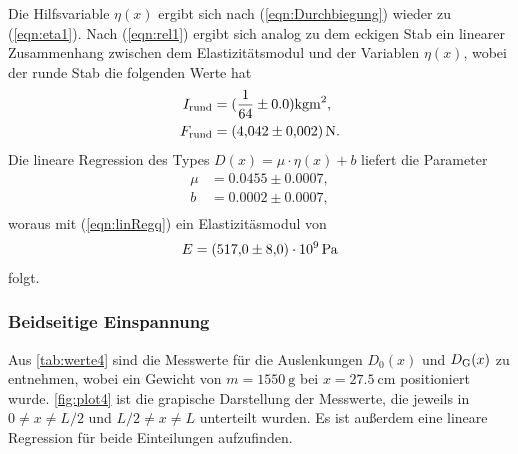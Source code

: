 \sloppy
Die Hilfsvariable $\eta(x)$ ergibt sich nach (\ref{eqn:Durchbiegung}) wieder zu (\ref{eqn:eta1}).
Nach (\ref{eqn:rel1}) ergibt sich analog zu dem eckigen Stab ein linearer Zusammenhang zwischen dem Elastizitätsmodul und
der Variablen $\eta(x)$, wobei der runde Stab die folgenden Werte hat
\begin{align*}
  I_{\text{rund}} &= (\frac{1}{64} \pm 0.0) \si{\kilo\gram\meter^2}, \\
  F_{\text{rund}} &= \SI{4.042 (0.002)}{\newton}. \\
\end{align*}
Die lineare Regression des Types $D(x) = \mu\cdot\eta(x)+b$ liefert die Parameter
\begin{align*}
  \mu &= 0.0455 \pm 0.0007,\\
  b &= 0.0002 \pm 0.0007, \\
\end{align*}
woraus mit (\ref{eqn:linRegq}) ein Elastizitäsmodul von
\begin{align*}
  E = \SI{517 (8.0)e9}{\Pa}
\end{align*}
folgt.


\subsubsection{Beidseitige Einspannung}
\label{subsubsec:rundBeidEins}
Aus \autoref{tab:werte4} sind die Messwerte für die Auslenkungen $D_0(x)$ und $D_{\text G}(x)$ zu entnehmen, wobei ein Gewicht von
$m=\SI{1550}{\gram}$ bei $x=\SI{27.5}{\cm}$ positioniert wurde. \autoref{fig:plot4} ist die grapische Darstellung der Messwerte, die 
jeweils in $0 \neq x \neq L/2$ und $L/2 \neq x\neq L$ unterteilt wurden. Es ist außerdem eine lineare Regression für beide Einteilungen
aufzufinden.

